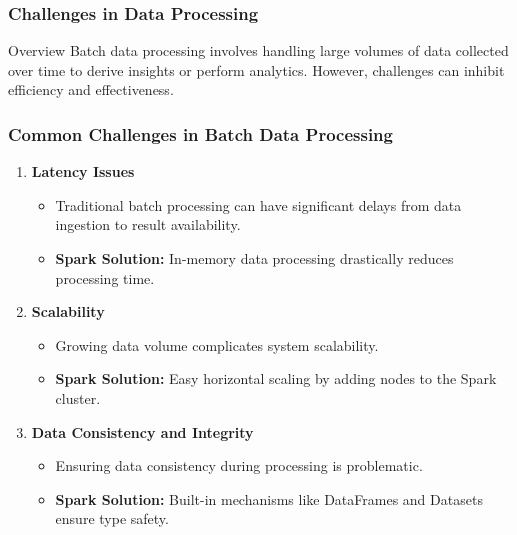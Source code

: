 \documentclass[aspectratio=169]{beamer}
\begin{document}
\begin{frame}
    \frametitle{Challenges in Data Processing}
    \begin{block}{Overview}
        Batch data processing involves handling large volumes of data collected over time to derive insights or perform analytics. However, challenges can inhibit efficiency and effectiveness. 
    \end{block}
\end{frame}

\begin{frame}
    \frametitle{Common Challenges in Batch Data Processing}
    \begin{enumerate}
        \item \textbf{Latency Issues}
            \begin{itemize}
                \item Traditional batch processing can have significant delays from data ingestion to result availability.
                \item \textbf{Spark Solution:} In-memory data processing drastically reduces processing time.
            \end{itemize}
        
        \item \textbf{Scalability}
            \begin{itemize}
                \item Growing data volume complicates system scalability.
                \item \textbf{Spark Solution:} Easy horizontal scaling by adding nodes to the Spark cluster.
            \end{itemize}
        
        \item \textbf{Data Consistency and Integrity}
            \begin{itemize}
                \item Ensuring data consistency during processing is problematic.
                \item \textbf{Spark Solution:} Built-in mechanisms like DataFrames and Datasets ensure type safety.
            \end{itemize}
    \end{enumerate}
\end{frame}
\end{document}
